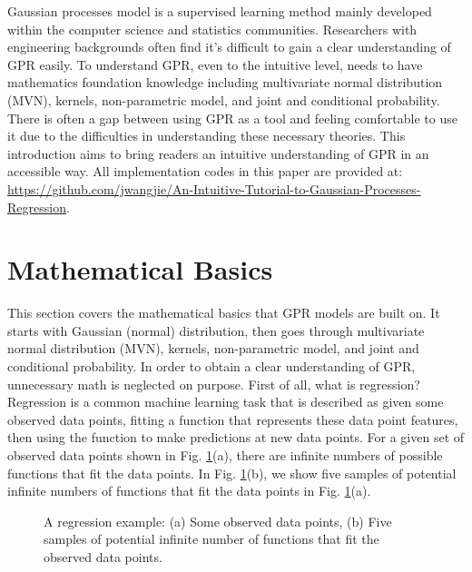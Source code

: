 \documentclass[12pt,letterpaper,fleqn,oneside,titlepage]{offroad-report}
\begin{document}
Gaussian processes model is a supervised learning method mainly developed within the computer science and statistics communities. Researchers with engineering backgrounds often find it's difficult to gain a clear understanding of GPR easily. To understand GPR, even to the intuitive level, needs to have mathematics foundation knowledge including multivariate normal distribution (MVN), kernels, non-parametric model, and joint and conditional probability. There is often a gap between using GPR as a tool and feeling comfortable to use it due to the difficulties in understanding these necessary theories. This introduction aims to bring readers an intuitive understanding of GPR in an accessible way. All implementation codes in this paper are provided at: \url{https://github.com/jwangjie/An-Intuitive-Tutorial-to-Gaussian-Processes-Regression}. 

\section{Mathematical Basics}
This section covers the mathematical basics that GPR models are built on. It starts with Gaussian (normal) distribution, then goes through multivariate normal distribution (MVN), kernels, non-parametric model, and joint and conditional probability. In order to obtain a clear understanding of GPR, unnecessary math is neglected on purpose. First of all, what is regression? Regression is a common machine learning task that is described as given some observed data points, fitting a function that represents these data point features, then using the function to make predictions at new data points. For a given set of observed data points shown in Fig. \ref{FIG:1}(a), there are infinite numbers of possible functions that fit the data points. In Fig. \ref{FIG:1}(b), we show five samples of potential infinite numbers of functions that fit the data points in Fig. \ref{FIG:1}(a). 
\begin{figure}[h!]
    \centering
    \qquad
    \caption{A regression example: (a) Some observed data points, (b) Five samples of potential infinite number of functions that fit the observed data points.}%
    \label{FIG:1}
\end{figure}
\end{document}
